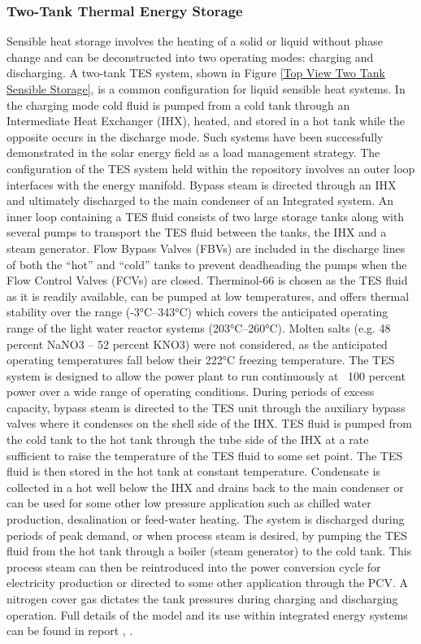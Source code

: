 \subsubsection{Two-Tank Thermal Energy Storage}

Sensible heat storage involves the heating of a solid or liquid without phase change and can be deconstructed into two operating modes: charging and discharging. A two-tank TES system, shown in Figure \ref{Top View Two Tank Sensible Storage}, is a common configuration for liquid sensible heat systems. In the charging mode cold fluid is pumped from a cold tank through an Intermediate Heat Exchanger (IHX), heated, and stored in a hot tank while the opposite occurs in the discharge mode. Such systems have been successfully demonstrated in the solar energy field as a load management strategy. The configuration of the TES system held within the repository involves an outer loop interfaces with the energy manifold. Bypass steam is directed through an IHX and ultimately discharged to the main condenser of an Integrated system. An inner loop containing a TES fluid consists of two large storage tanks along with several pumps to transport the TES fluid between the tanks, the IHX and a steam generator. Flow Bypass Valves (FBVs) are included in the discharge lines of both the “hot” and “cold” tanks to prevent deadheading the pumps when the Flow Control Valves (FCVs) are closed. Therminol-66 is chosen as the TES fluid as it is readily available, can be pumped at low temperatures, and offers thermal stability over the range (-3°C–343°C) which covers the anticipated operating range of the light water reactor systems (203°C–260°C). Molten salts (e.g. 48 percent  NaNO3 – 52 percent KNO3) were not considered, as the anticipated operating temperatures fall below their 222°C freezing temperature. The TES system is designed to allow the power plant to run continuously at ~100 percent power over a wide range of operating conditions. During periods of excess capacity, bypass steam is directed to the TES unit through the auxiliary bypass valves where it condenses on the shell side of the IHX. TES fluid is pumped from the cold tank to the hot tank through the tube side of the IHX at a rate sufficient to raise the temperature of the TES fluid to some set point. The TES fluid is then stored in the hot tank at constant temperature. Condensate is collected in a hot well below the IHX and drains back to the main condenser or can be used for some other low pressure application such as chilled water production, desalination or feed-water heating. The system is discharged during periods of peak demand, or when process steam is desired, by pumping the TES fluid from the hot tank through a boiler (steam generator) to the cold tank. This process steam can then be reintroduced into the power conversion cycle for electricity production or directed to some other application through the PCV. A nitrogen cover gas dictates the tank pressures during charging and discharging operation. Full details of the model and its use within integrated energy systems can be found in report \cite{2018ThermalStorage}, \cite{FrickThermalStorage}. 

